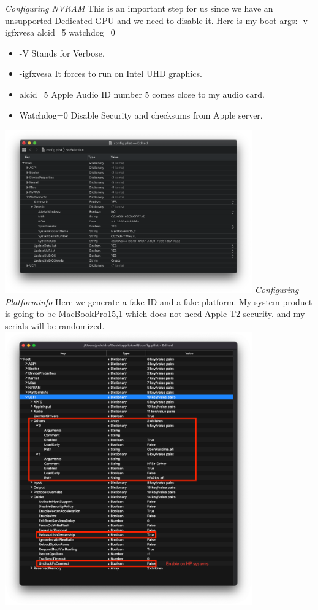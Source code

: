 \documentclass[12pt, letterpaper]{article}
\begin{document}
\break
\emph{Configuring NVRAM}
\hfill\break
\hfill\break
This is an important step for us since we have an unsupported Dedicated GPU and we need to disable it.
\hfill\break
\hfill\break
Here is my boot-args: -v -igfxvesa alcid=5 watchdog=0
\begin{itemize}
    \item -V
    \break
    Stands for Verbose.
    \item -igfxvesa
    \break
    It forces to run on Intel UHD graphics.
    \item alcid=5
    \break
    Apple Audio ID number 5 comes close to my audio card.
    \item Watchdog=0
    \break
    Disable Security and checksums from Apple server.
\end{itemize}

\includegraphics[width=0.8\textwidth]{fotos/PSP/Propertree/Platform info .png}
\break
\emph{Configuring Platforminfo}
\hfill\break
\hfill\break
Here we generate a fake ID and a fake platform. My system product is going to be MacBookPro15,1 which does not need Apple T2 security. and my serials will be randomized.
\hfill\break
\hfill\break
\includegraphics[width=0.8\textwidth]{fotos/PSP/Propertree/UEFI.png}
\end{document}
